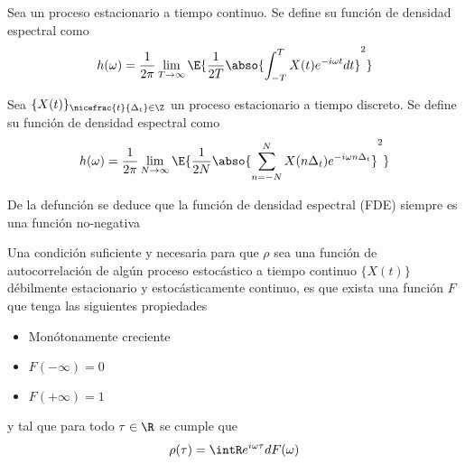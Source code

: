\begin{definicion}
Sea \xt un proceso estacionario a tiempo continuo. Se define su {función de densidad 
espectral} como
\begin{equation}
h(\omega) = \frac{1}{2 \pi} \lim_{T\rightarrow \infty} \E{ \frac{1}{2T} 
\abso{ \int_{-T}^{T} X(t) e^{-i \omega t} dt}^{2} }
\label{txt_FDE_cont}
\end{equation}
\end{definicion}

\begin{definicion}
Sea $\{X(t)\}_{\nicefrac{t}{\Delta_t}\in \Z}$ un proceso estacionario a tiempo discreto. Se 
define su {función de densidad espectral} como
\begin{equation}
h(\omega) = \frac{1}{2 \pi} \lim_{N\rightarrow \infty} \E{ \frac{1}{2N} 
\abso{ \sum_{n=-N}^{N} X(n \Delta_t) e^{-i \omega n \Delta_t}}^{2} }
\label{txt_FDE_disc}
\end{equation}
\end{definicion}

De la defunción se deduce que la función de densidad espectral (FDE) siempre es una función
no-negativa



\begin{teorema}
Una condición suficiente y necesaria para que $\rho$ sea una función de autocorrelación de 
algún proceso estocástico a tiempo continuo $\{X(t)\}$ débilmente estacionario y 
estocásticamente continuo, es que exista una función $F$ que tenga las siguientes propiedades
\begin{itemize}
\item Monótonamente creciente
\item $F(-\infty) = 0$
\item $F(+\infty) = 1$
\end{itemize}
y tal que para todo $\tau \in \R$ se cumple que
\begin{equation*}
\rho(\tau) = \intR e^{i \omega \tau} dF(\omega)
\end{equation*}
\label{t_wienerkhinchin}
\end{teorema}

